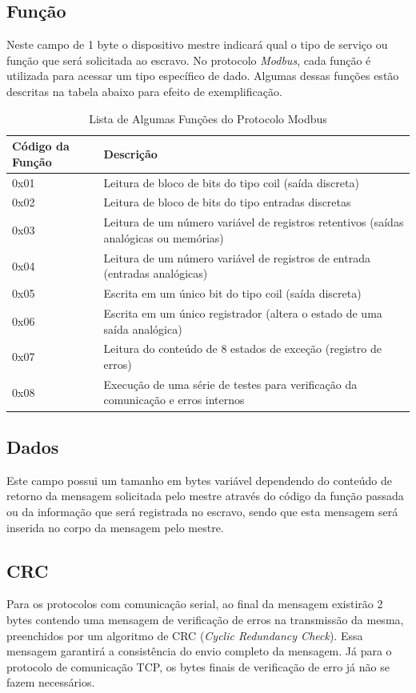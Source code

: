 \subsection{Função}

Neste campo de 1 byte o dispositivo mestre indicará qual o tipo de serviço ou função que será solicitada ao escravo. No protocolo \textit{Modbus}, cada função é utilizada para acessar um tipo específico de dado. Algumas dessas funções estão descritas na tabela abaixo para efeito de exemplificação.


\begin{table}[H]
\centering
\caption{Lista de Algumas Funções do Protocolo Modbus}
\label{tab:tabela_funcoes_modbus}
\begin{tabular}{| l | m{11cm} |}
\hline
\textbf{Código da Função} & \textbf{Descrição} \\ [10pt]
\hline
0x01 & Leitura de bloco de bits do tipo coil (saída discreta) \\ 
\hline
0x02 & Leitura de bloco de bits do tipo entradas discretas \\ 
\hline
0x03 & Leitura de um número variável de registros retentivos (saídas analógicas ou memórias) \\ 
\hline
0x04 & Leitura de um número variável de registros de entrada (entradas analógicas)\\ 
\hline
0x05 & Escrita em um único bit do tipo coil (saída discreta) \\ 
\hline
0x06 & Escrita em um único registrador (altera o estado de uma saída analógica)\\ 
\hline
0x07 & Leitura do conteúdo de 8 estados de exceção (registro de erros) \\ 
\hline
0x08 & Execução de uma série de testes para verificação da comunicação e erros internos\\ 
\hline
\end{tabular}
\end{table}

\subsection{Dados}

Este campo possui um tamanho em bytes variável dependendo do conteúdo de retorno da mensagem solicitada pelo mestre através do código da função passada ou da informação que será registrada no escravo, sendo que esta mensagem será inserida no corpo da mensagem pelo mestre.

\subsection{CRC}

Para os protocolos com comunicação serial, ao final da mensagem existirão 2 bytes contendo uma mensagem de verificação de erros na transmissão da mesma, preenchidos por um algoritmo de CRC (\textit{Cyclic Redundancy Check}). Essa mensagem garantirá a consistência do envio completo da mensagem.
Já para o protocolo de comunicação TCP, os bytes finais de verificação de erro já não se fazem necessários.


